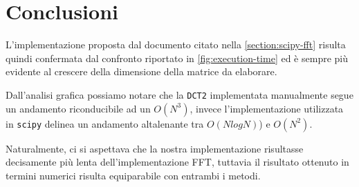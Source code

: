 \documentclass[11pt,italian]{article}
\begin{document}
\newpage
\section{Conclusioni}
L'implementazione proposta dal documento citato nella \cref{section:scipy-fft} risulta quindi confermata dal confronto riportato in \cref{fig:execution-time} ed è sempre più evidente al crescere della dimensione della matrice da elaborare.

Dall'analisi grafica possiamo notare che la \lstinline{DCT2} implementata manualmente segue un andamento riconducibile ad un $O(N^3)$, invece l'implementazione utilizzata in \lstinline{scipy} delinea un andamento altalenante tra $O(NlogN)$) e $O(N^2)$.

Naturalmente, ci si aspettava che la nostra implementazione risultasse decisamente più lenta dell'implementazione FFT, tuttavia il risultato ottenuto in termini numerici risulta equiparabile con entrambi i metodi.
\end{document}
